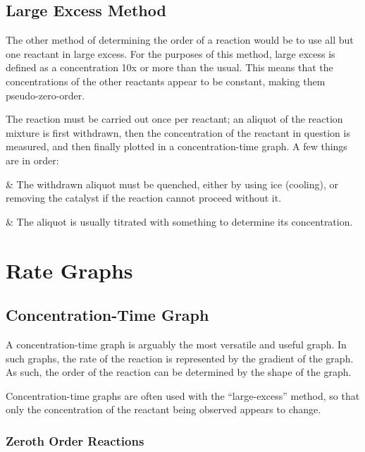 		\subsection{Large Excess Method}

			The other method of determining the order of a reaction would be to use all but one reactant in large excess. For the purposes of this
			method, large excess is defined as a concentration 10x or more than the usual. This means that the concentrations of the other
			reactants appear to be constant, making them pseudo-zero-order.

			The reaction must be carried out once per reactant; an aliquot of the reaction mixture is first withdrawn, then the concentration of the
			reactant in question is measured, and then finally plotted in a concentration-time graph. A few things are in order:

			\begin{bulletlist}
				&	The withdrawn aliquot must be quenched, either by using ice (cooling), or removing the catalyst if the reaction cannot proceed
					without it.

				&	The aliquot is usually titrated with something to determine its concentration.
			\end{bulletlist}






	\pagebreak
	\section{Rate Graphs}

		\subsection{Concentration-Time Graph}

			A concentration-time graph is arguably the most versatile and useful graph. In such graphs, the rate of the reaction is represented
			by the gradient of the graph. As such, the order of the reaction can be determined by the shape of the graph.

			Concentration-time graphs are often used with the \enquote{large-excess} method, so that only the concentration of the reactant being
			observed appears to change.


			\subsubsection{Zeroth Order Reactions}

